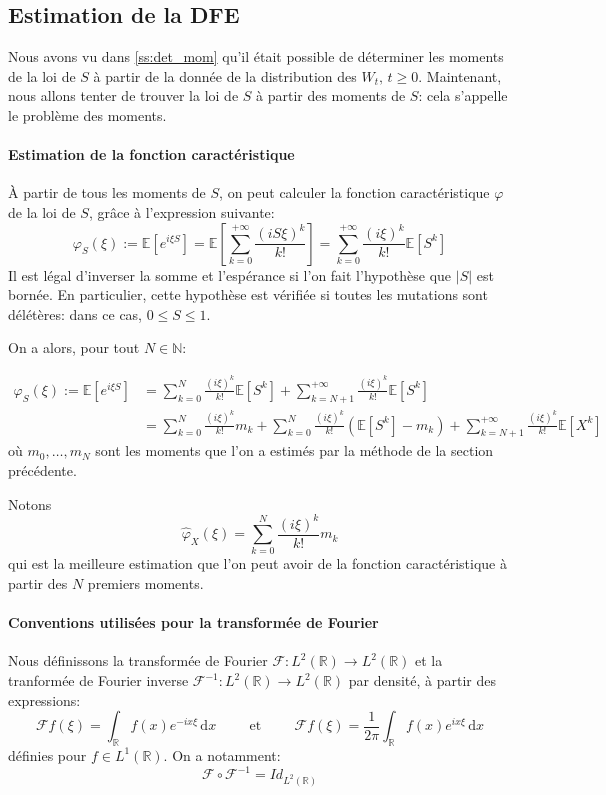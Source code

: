 \documentclass[12pt]{article}
\newcommand{\pth}[1]{\left(#1\right)}
\newcommand{\cro}[1]{\left[#1\right]}
\newcommand{\abs}[1]{\left|#1\right|}
\newcommand{\et}{\hspace{1cm}\text{et}\hspace{1cm}}
\newcommand{\vg}{,\,}
\newcommand{\Er}{\mathbb{R}}
\newcommand{\En}{\mathbb{N}}
\newcommand{\Esp}[1]{\mathbb{E}\cro{#1}}
\newcommand{\de}{\,\mathrm{d}}
\newcommand{\fr}{\mathcal{F}}
\begin{document}
\subsection{Estimation de la DFE}

Nous avons vu dans \ref{ss:det_mom} qu'il était possible de déterminer les moments de la loi de $S$ à partir de la donnée de la distribution des $W_t\vg t\geqslant 0$. Maintenant, nous allons tenter de trouver la loi de $S$ à partir des moments de $S$: cela s'appelle le problème des moments.

\paragraph{Estimation de la fonction caractéristique}

À partir de tous les moments de $S$, on peut calculer la fonction caractéristique $\varphi$ de la loi de $S$, grâce à l'expression suivante:
\[\varphi_S(\xi):=\Esp{e^{i\xi S}}=\Esp{\sum_{k=0}^{+\infty}\frac{(iS\xi)^k}{k!}}=\sum_{k=0}^{+\infty}\frac{(i\xi)^k}{k!}\Esp{S^k}\]
Il est légal d'inverser la somme et l'espérance si l'on fait l'hypothèse que $\abs{S}$ est bornée. En particulier, cette hypothèse est vérifiée si toutes les mutations sont délétères: dans ce cas, $0\leqslant S\leqslant 1$.

On a alors, pour tout $N\in\En$:

\begin{align*}
\varphi_S(\xi):=\Esp{e^{i\xi S}}
&=\sum_{k=0}^{N}\frac{(i\xi)^k}{k!}\Esp{S^k}+\sum_{k=N+1}^{+\infty}\frac{(i\xi)^k}{k!}\Esp{S^k}\\
&= \sum_{k=0}^{N}\frac{(i\xi)^k}{k!}m_k + \sum_{k=0}^{N}\frac{(i\xi)^k}{k!}\pth{\Esp{S^k}-m_k}+\sum_{k=N+1}^{+\infty}\frac{(i\xi)^k}{k!}\Esp{X^k}
\end{align*}
où $m_0,\hdots, m_N$ sont les moments que l'on a estimés par la méthode de la section précédente.

Notons \[\hat{\varphi}_X(\xi)=\sum_{k=0}^{N}\frac{(i\xi)^k}{k!}m_k\] qui est la meilleure estimation que l'on peut avoir de la fonction caractéristique à partir des $N$ premiers moments.

\paragraph{Conventions utilisées pour la transformée de Fourier}

Nous définissons la transformée de Fourier $\fr:L^2(\Er)\to L^2(\Er)$ et la tranformée de Fourier inverse $\fr^{-1}:L^2(\Er)\to L^2(\Er)$ par densité, à partir des expressions:
\[\fr f(\xi)=\int_{\Er}f(x)e^{-ix\xi}\de x\et \fr f(\xi)=\frac{1}{2\pi}\int_{\Er}f(x)e^{ix\xi}\de x\]
définies pour $f\in L^1(\Er)$. On a notamment: \[\fr\circ\fr^{-1}=Id_{L^2(\Er)}\]
\end{document}

